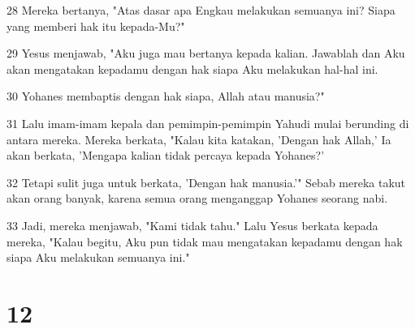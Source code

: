 \par 28 Mereka bertanya, "Atas dasar apa Engkau melakukan semuanya ini? Siapa yang memberi hak itu kepada-Mu?"
\par 29 Yesus menjawab, "Aku juga mau bertanya kepada kalian. Jawablah dan Aku akan mengatakan kepadamu dengan hak siapa Aku melakukan hal-hal ini.
\par 30 Yohanes membaptis dengan hak siapa, Allah atau manusia?"
\par 31 Lalu imam-imam kepala dan pemimpin-pemimpin Yahudi mulai berunding di antara mereka. Mereka berkata, "Kalau kita katakan, 'Dengan hak Allah,' Ia akan berkata, 'Mengapa kalian tidak percaya kepada Yohanes?'
\par 32 Tetapi sulit juga untuk berkata, 'Dengan hak manusia.'" Sebab mereka takut akan orang banyak, karena semua orang menganggap Yohanes seorang nabi.
\par 33 Jadi, mereka menjawab, "Kami tidak tahu." Lalu Yesus berkata kepada mereka, "Kalau begitu, Aku pun tidak mau mengatakan kepadamu dengan hak siapa Aku melakukan semuanya ini."

\chapter{12}

